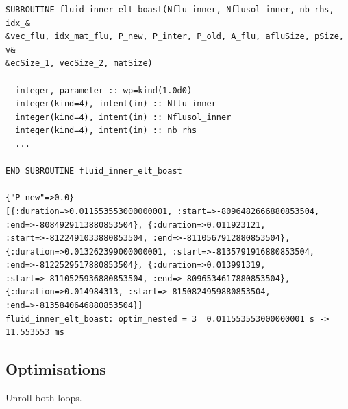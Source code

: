 \documentclass[10pt,twoside]{article}   	%
\begin{document}
\begin{lstlisting}[caption=Results (obtained with the command ruby run\_boast.rb)]
SUBROUTINE fluid_inner_elt_boast(Nflu_inner, Nflusol_inner, nb_rhs, idx_&
&vec_flu, idx_mat_flu, P_new, P_inter, P_old, A_flu, afluSize, pSize, v&
&ecSize_1, vecSize_2, matSize)

  integer, parameter :: wp=kind(1.0d0)
  integer(kind=4), intent(in) :: Nflu_inner
  integer(kind=4), intent(in) :: Nflusol_inner
  integer(kind=4), intent(in) :: nb_rhs
  ...
  
END SUBROUTINE fluid_inner_elt_boast

{"P_new"=>0.0}
[{:duration=>0.011553553000000001, :start=>-8096482666880853504, :end=>-8084929113880853504}, {:duration=>0.011923121, :start=>-8122491033880853504, :end=>-8110567912880853504}, {:duration=>0.013262399000000001, :start=>-8135791916880853504, :end=>-8122529517880853504}, {:duration=>0.013991319, :start=>-8110525936880853504, :end=>-8096534617880853504}, {:duration=>0.014984313, :start=>-8150824959880853504, :end=>-8135840646880853504}]
fluid_inner_elt_boast: optim_nested = 3  0.011553553000000001 s ->  11.553553 ms
\end{lstlisting}


\subsection{Optimisations}


Unroll both loops.
\end{document}
